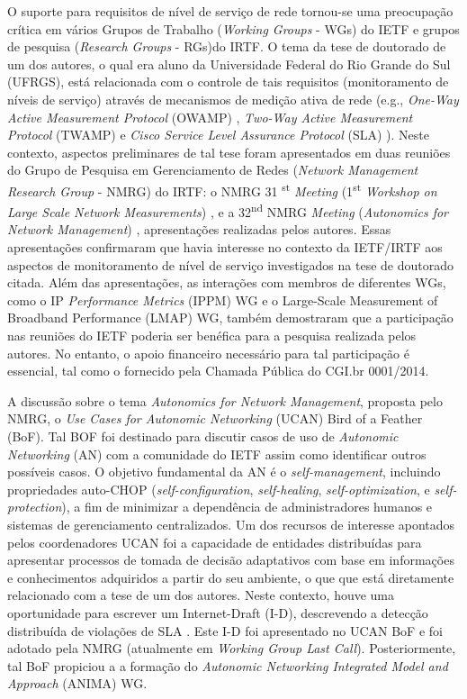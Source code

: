 \documentclass[12pt]{article}
\begin{document}
O suporte para requisitos de nível de serviço de rede tornou-se uma preocupação crítica em vários Grupos de Trabalho (\textit{Working Groups} - WGs) do IETF e grupos de pesquisa (\textit{Research Groups} - RGs)do IRTF. O tema da tese de doutorado de um dos autores, o qual era aluno da Universidade Federal do Rio Grande do Sul (UFRGS), está relacionada com o controle de tais requisitos (monitoramento de níveis de serviço) através de mecanismos de medição ativa de rede (e.g., \textit{One-Way Active Measurement Protocol} (OWAMP) \cite{OWAMP-Shalunov-2006}, \textit{Two-Way Active Measurement Protocol} (TWAMP) \cite{TWAMP-Hedayat-2008} e \textit{Cisco Service Level Assurance Protocol} (SLA) \cite{IPSLA-Chiba-2013}). Neste contexto, aspectos preliminares de tal tese foram apresentados em duas reuniões do Grupo de Pesquisa em Gerenciamento de Redes (\textit{Network Management Research Group} - NMRG) do IRTF: o NMRG 31 \textsuperscript{st} \textit{Meeting} (1\textsuperscript{st} \textit{Workshop on Large Scale Network Measurements}) \cite{P2PBNM-Nobre-2013a}, e a 32\textsuperscript{nd} NMRG \textit{Meeting} (\textit{Autonomics for Network Management}) \cite{P2PBNM-Nobre-2013b}, apresentações realizadas pelos autores. Essas apresentações confirmaram que havia interesse no contexto da IETF/IRTF aos aspectos de monitoramento de nível de serviço investigados na tese de doutorado citada. Além das apresentações, as interações com membros de diferentes WGs, como o IP \textit{Performance Metrics} (IPPM) WG e o Large-Scale Measurement of Broadband Performance (LMAP) WG, também demostraram que a participação nas reuniões do IETF poderia ser benéfica para a pesquisa realizada pelos autores. No entanto, o apoio financeiro necessário para tal participação é essencial, tal como o fornecido pela Chamada Pública do CGI.br 0001/2014.


A discussão sobre o tema \textit{Autonomics for Network Management}, proposta pelo NMRG, o \textit{Use Cases for Autonomic Networking} (UCAN) Bird of a Feather (BoF). Tal BOF foi destinado para discutir casos de uso de \textit{Autonomic Networking} (AN) com a comunidade do IETF assim como identificar outros possíveis casos. O objetivo fundamental da AN é o \textit{self-management}, incluindo propriedades auto-CHOP (\textit{self-configuration}, \textit{self-healing}, \textit{self-optimization}, e \textit{self-protection}), a fim de minimizar a dependência de administradores humanos e sistemas de gerenciamento centralizados. Um dos recursos de interesse apontados pelos coordenadores UCAN foi a capacidade de entidades distribuídas para apresentar processos de tomada de decisão adaptativos com base em informações e conhecimentos adquiridos a partir do seu ambiente, o que que está diretamente relacionado com a tese de um dos autores. Neste contexto, houve uma oportunidade para escrever um Internet-Draft (I-D), descrevendo a detecção distribuída de violações de SLA \cite{NMRG-Nobre-2015}.  Este I-D foi apresentado no UCAN BoF e foi adotado pela NMRG (atualmente em \textit{Working Group Last Call}). Posteriormente, tal BoF propiciou a  a formação do \textit{Autonomic Networking Integrated Model and Approach} (ANIMA) WG.
\end{document}
